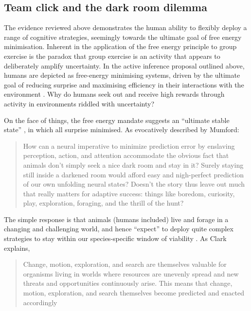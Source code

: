 \begin{CJK}{UTF8}{gbsn}
\subsection{Team click and the dark room dilemma}
The evidence reviewed above demonstrates the human ability to flexibly deploy a range of cognitive strategies, seemingly towards the ultimate goal of free energy minimisation.  Inherent in the application of the free energy principle to group exercise is the paradox that group exercise is an activity that appears to deliberately amplify uncertainty.  In the active inference proposal outlined above, humans are depicted as free-energy minimising systems, driven by the ultimate goal of reducing surprise and maximising efficiency in their interactions with the environment \citep{Friston2010}.  Why do humans seek out and receive high rewards through activity in environments riddled with uncertainty?

On the face of things, the free energy mandate suggests an ``ultimate stable state'' \citep{Mumford1992}, in which all surprise minimised.  As evocatively described by Mumford:

\begin{quote}
  How can a neural imperative to minimize prediction error by enslaving perception, action, and attention accommodate the obvious fact that animals don’t simply seek a nice dark room and stay in it? Surely staying still inside a darkened room would afford easy and nigh-perfect prediction of our own unfolding neural states? Doesn’t the story thus leave out much that really matters for adaptive success: things like boredom, curiosity, play, exploration, foraging, and the thrill of the hunt? \citep[243]{Mumford1992}
\end{quote}

The simple response is that animals (humans included) live and forage in a changing and challenging world, and hence ``expect'' to deploy quite complex strategies to stay within our species-specific window of viability \citep{Bruineberg2014}.  As Clark explains,

\begin{quote}
  Change, motion, exploration, and search are themselves valuable for organisms living in worlds where resources are unevenly spread and new threats and opportunities continuously arise.  This means that change, motion, exploration, and search themselves become predicted and enacted accordingly \citep[193]{Clark2013}
\end{quote}



\end{CJK}
